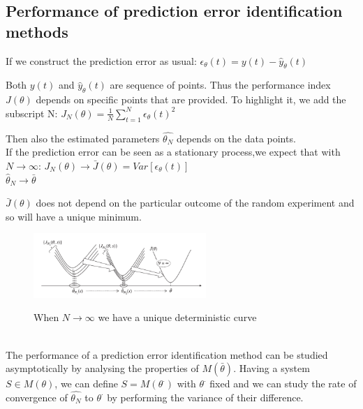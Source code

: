\documentclass[10pt,a4paper]{article}
\begin{document}
\subsection{Performance of prediction error identification methods}
If we construct the prediction error as usual:
\center
	$\epsilon_\theta(t)=y(t)-\hat{y}_\theta(t)$
\\ \raggedright
Both $y(t)$ and $\hat{y}_\theta(t)$ are sequence of points. Thus the performance index $J(\theta)$ depends on specific points that are provided. To highlight it, we add the subscript N:
\center
	$J_N(\theta) = \frac{1}{N}\sum_{t=1}^N\epsilon_\theta(t)^2$
\\ \raggedright \vspace{0.5em}
Then also the estimated parameters $\hat{\theta_N}$ depends on the data points. \\If the prediction error can be seen as a stationary process,we expect that with $N \rightarrow \infty$:
\center $J_N(\theta) \rightarrow \bar{J}(\theta)=Var[\epsilon_\theta(t)]$\\  $\hat{\theta}_N \rightarrow \bar{\theta}$
\\ \raggedright \vspace{0.3em}
$\bar{J}(\theta)$ does not depend on the particular outcome of the random experiment and so will have a unique minimum.
 \begin{figure}[h!]
 \hfill \includegraphics[width=185pt]{images/pem.png}\hspace*{\fill}
  \label{fig:pem}
  \caption{When $N \rightarrow \infty$ we have a unique deterministic curve}
\end{figure} \\
The performance of a prediction error identification method can be studied asymptotically by analysing the properties of $M(\bar{\theta})$. Having a system $S \in M(\theta)$, we can define $S=M(\theta^\cdot)$ with $\theta^\cdot$ fixed and we can study the rate of convergence of $\hat{\theta_N}$ to $\theta^\cdot$ by performing the variance of their difference.
\end{document}

